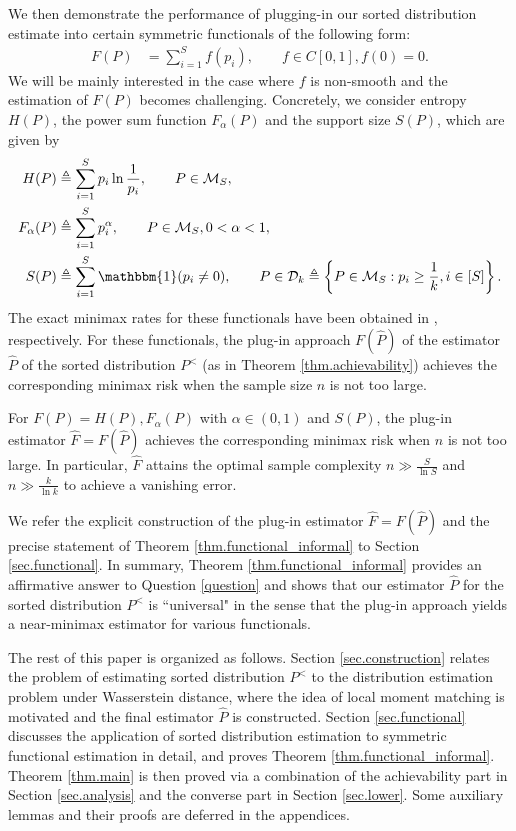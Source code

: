 \documentclass[final,12pt]{colt2018} %
\newcommand{\calD}{{\mathcal{D}}}
\newcommand{\calM}{{\mathcal{M}}}
\begin{document}
We then demonstrate the performance of plugging-in our sorted distribution estimate into certain symmetric functionals of the following form:
\begin{align}\label{eq.general_functional}
F(P) &= \sum_{i=1}^S f(p_i), \qquad f\in C[0,1], f(0)=0.
\end{align}
We will be mainly interested in the case where $f$ is non-smooth and the estimation of $F(P)$ becomes challenging. Concretely, we consider entropy $H(P)$, the power sum function $F_\alpha(P)$ and the support size $S(P)$, which are given by
\begin{align*}
H(P) &\triangleq \sum_{i=1}^S p_i\ln \frac{1}{p_i}, \qquad  P\in\calM_S, \\
F_\alpha(P) &\triangleq \sum_{i=1}^S p_i^\alpha, \qquad  P\in\calM_S, 0<\alpha<1, \\
S(P) &\triangleq \sum_{i=1}^S \mathbbm{1}(p_i\neq 0), \qquad  P\in \calD_k\triangleq \left\{P\in\calM_S: p_i\ge \frac{1}{k}, i\in [S]\right\}.
\end{align*}
The exact minimax rates for these functionals have been obtained in \cite{wu2016minimax,Jiao--Venkat--Han--Weissman2015minimax,wu2015chebyshev}, respectively. For these functionals, the plug-in approach $F(\hat{P})$ of the estimator $\hat{P}$ of the sorted distribution $P^<$ (as in Theorem \ref{thm.achievability}) achieves the corresponding minimax risk when the sample size $n$ is not too large.
\begin{theorem}[Informal]\label{thm.functional_informal}
	For $F(P)=H(P), F_\alpha(P)$ with $\alpha\in (0,1)$ and $S(P)$, the plug-in estimator $\hat{F}=F(\hat{P})$ achieves the corresponding minimax risk when $n$ is not too large. In particular, $\hat{F}$ attains the optimal sample complexity $n\gg \frac{S}{\ln S}$ and $n\gg \frac{k}{\ln k}$ to achieve a vanishing error.
\end{theorem}

We refer the explicit construction of the plug-in estimator $\hat{F}=F(\hat{P})$ and the precise statement of Theorem \ref{thm.functional_informal} to Section \ref{sec.functional}. In summary, Theorem \ref{thm.functional_informal} provides an affirmative answer to Question \ref{question} and shows that our estimator $\hat{P}$ for the sorted distribution $P^<$ is ``universal" in the sense that the plug-in approach yields a near-minimax estimator for various functionals.

The rest of this paper is organized as follows. Section \ref{sec.construction} relates the problem of estimating sorted distribution $P^<$ to the distribution estimation problem under Wasserstein distance, where the idea of local moment matching is motivated and the final estimator $\hat{P}$ is constructed. Section \ref{sec.functional} discusses the application of sorted distribution estimation to symmetric functional estimation in detail, and proves Theorem \ref{thm.functional_informal}. Theorem \ref{thm.main} is then proved via a combination of the achievability part in Section \ref{sec.analysis} and the converse part in Section \ref{sec.lower}. Some auxiliary lemmas and their proofs are deferred in the appendices.
\end{document}
